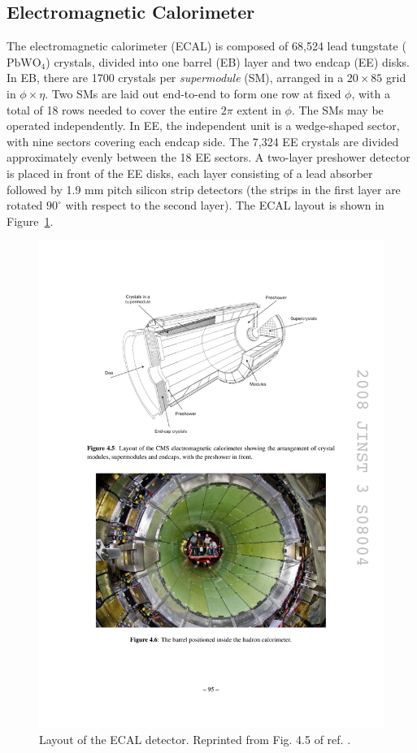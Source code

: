 \documentclass[dissertation.tex]{subfiles}
\begin{document}
\subsection{Electromagnetic Calorimeter}
\label{sec:Electromagnetic Calorimeter}

The electromagnetic calorimeter (ECAL) is composed of 68,524 lead tungstate ($\mbox{PbWO}_{4}$) crystals, divided into one barrel (EB) layer and two endcap (EE) disks.  In EB, there are 1700 crystals per \textit{supermodule} (SM), arranged in a $20\times85$ grid in $\phi\times\eta$.  Two SMs are laid out end-to-end to form one row at fixed $\phi$, with a total of 18 rows needed to cover the entire $2\pi$ extent in $\phi$.  The SMs may be operated independently.  In EE, the independent unit is a wedge-shaped sector, with nine sectors covering each endcap side.  The 7,324 EE crystals are divided approximately evenly between the 18 EE sectors.  A two-layer preshower detector is placed in front of the EE disks, each layer consisting of a lead absorber followed by 1.9 mm pitch silicon strip detectors (the strips in the first layer are rotated $90^{\circ}$ with respect to the second layer).  The ECAL layout is shown in Figure~\ref{fig:ECAL_layout}.

\begin{figure}
	\centering
	\includegraphics[scale=1.0]{ECAL_layout}
	\caption{Layout of the ECAL detector.  Reprinted from Fig. 4.5 of ref. \cite{CMS_detector_paper}.}
	\label{fig:ECAL_layout}
\end{figure}
\end{document}
